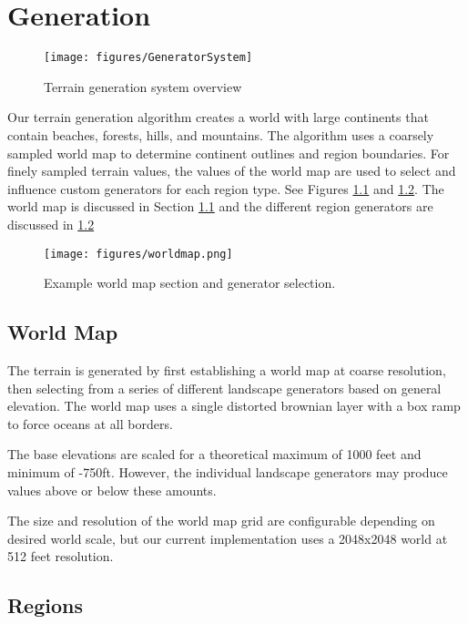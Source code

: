 
\chapter{Generation} \label{generation}

\begin{figure}
  \centering
    \texttt{[image: figures/GeneratorSystem]}
  \caption{Terrain generation system overview}
  \label{fig:gen_overview}
\end{figure}

Our terrain generation algorithm creates a world with large continents that contain beaches, forests, hills, and mountains.
The algorithm uses a coarsely sampled world map to determine continent outlines and region boundaries.
For finely sampled terrain values, the values of the world map are used to select and influence custom generators for each region type.
See Figures \ref{fig:gen_overview} and \ref{fig:worldmap}.
The world map is discussed in Section \ref{sec:worldmap} and the different region generators are discussed in \ref{sec:region}

\begin{figure}
	\centering
		\texttt{[image: figures/worldmap.png]}
	\caption{Example world map section and generator selection.}
	\label{fig:worldmap}
\end{figure}

\section{World Map} \label{sec:worldmap}

The terrain is generated by first establishing a world map at coarse resolution, then selecting from a series of different landscape generators based on general elevation.
The world map uses a single distorted brownian layer with a box ramp to force oceans at all borders.

The base elevations are scaled for a theoretical maximum of 1000 feet and minimum of -750ft.
However, the individual landscape generators may produce values above or below these amounts.

The size and resolution of the world map grid are configurable depending on desired world scale, but our current implementation uses a 2048x2048 world at 512 feet resolution.

\section{Regions} \label{sec:region}

